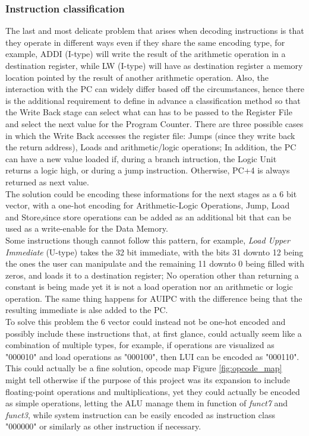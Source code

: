 \subsubsection{Instruction classification}
The last and most delicate problem that arises when decoding instructions is that they operate in different ways even if they share the same encoding type, for example, ADDI (I-type) will write the result of the arithmetic operation in a destination register, while LW (I-type) will have as destination register a memory location pointed by the result of another arithmetic operation. Also, the interaction with the PC can widely differ based off the circumstances, hence there is the additional requirement to define in advance a classification method so that the Write Back stage can select what can has to be passed to the Register File and select the next value for the Program Counter. There are three possible cases in which the Write Back accesses the register file: Jumps (since they write back the return address), Loads and arithmetic/logic operations; In addition, the PC can have a new value loaded if, during a branch intruction, the Logic Unit returns a logic high, or during a jump instruction. Otherwise, PC+4 is always returned as next value.\\
The solution could be encoding these informations for the next stages as a 6 bit vector, with a one-hot encoding for Arithmetic-Logic Operations, Jump, Load and Store,since store operations can be added as an additional bit that can be used as a write-enable for the Data Memory.\\
Some instructions though cannot follow this pattern, for example, \emph{Load Upper Immediate} (U-type) takes the 32 bit immediate, with the bits 31 downto 12 being the ones the user can manipulate and the remaining 11 downto 0 being filled with zeros, and loads it to a destination register; No operation other than returning a constant is being made yet it is not a load operation nor an arithmetic or logic operation. The same thing happens for AUIPC with the difference being that the resulting immediate is alse added to the PC.\\
To solve this problem the 6 vector could instead not be one-hot encoded and possibly include these instructions that, at first glance, could actually seem like a combination of multiple types, for example, if operations are visualized as "000010" and load operations as "000100", then LUI can be encoded as "000110". This could actually be a fine solution, opcode map Figure \ref{fig:opcode_map} might tell otherwise if the purpose of this project was its expansion to include floating-point operations and multiplications, yet they could actually be encoded as simple operations, letting the ALU manage them in function of \emph{funct7} and \emph{funct3}, while system instruction can be easily encoded as instruction class "000000" or similarly as other instruction if necessary.


